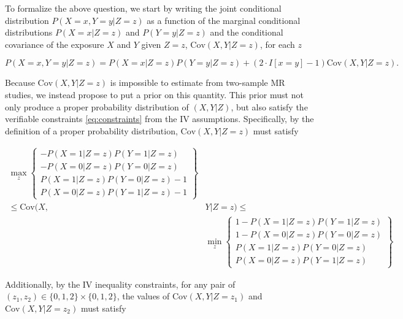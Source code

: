 \documentclass[
]{article}
\theoremstyle{plain}
\begin{document}
To formalize the above question, we start by writing the joint conditional distribution \(P(X = x, Y = y | Z = z)\) as a function of the marginal conditional distributions \(P(X = x | Z = z)\) and \(P(Y = y | Z = z)\) and the conditional covariance of the exposure \(X\) and \(Y\) given \(Z=z\), \(\text{Cov}(X, Y | Z = z)\), for each \(z\)

\begin{equation}
P(X = x, Y = y | Z = z) = P(X = x | Z = z)P(Y = y | Z = z) + (2\cdot I[x = y] - 1)\text{Cov}(X, Y | Z = z). \label{eq:cov-expression}
\end{equation}

Because \(\text{Cov}(X, Y | Z = z)\) is impossible to estimate from two-sample MR studies, we instead propose to put a prior on this quantity. This prior must not only produce a proper probability distribution of \((X,Y|Z)\), but also satisfy the verifiable constraints \eqref{eq:constraints} from the IV assumptions. Specifically, by the definition of a proper probability distribution, \(\text{Cov}(X, Y | Z = z)\) must satisfy

\[
\begin{aligned}
  \max_z\left\{
      \begin{array}{c}
        -P(X = 1 | Z = z)P(Y = 1 | Z = z) \\
        -P(X = 0 | Z = z)P(Y = 0 | Z = z) \\
        P(X = 1 | Z = z)P(Y = 0 | Z = z) - 1\\
        P(X = 0 | Z = z)P(Y = 1 | Z = z) - 1
      \end{array}
    \right\} & \\
    \le \text{Cov}(X, &Y | Z = z) \le \\
    &\min_z\left\{
      \begin{array}{c}
        1 - P(X = 1 | Z = z)P(Y = 1 | Z = z) \\
        1 - P(X = 0 | Z = z)P(Y = 0 | Z = z) \\
        P(X = 1 | Z = z)P(Y = 0 | Z = z) \\
        P(X = 0 | Z = z)P(Y = 1 | Z = z)
      \end{array}
    \right\}
\end{aligned}
\]

Additionally, by the IV inequality constraints, for any pair of \((z_1, z_2) \in \{0,1,2\} \times \{0,1,2\}\), the values of \(\text{Cov}(X, Y | Z = z_1)\) and \(\text{Cov}(X, Y | Z = z_2)\) must satisfy
\end{document}
